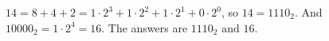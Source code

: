$14=8+4+2=1\cdot2^3+1\cdot2^2+1\cdot2^1+0\cdot2^0$, so $14=1110_2$. And $10000_2=1\cdot2^4=16$. The answers are $\boxed{1110_2\text{ and }16}$.
